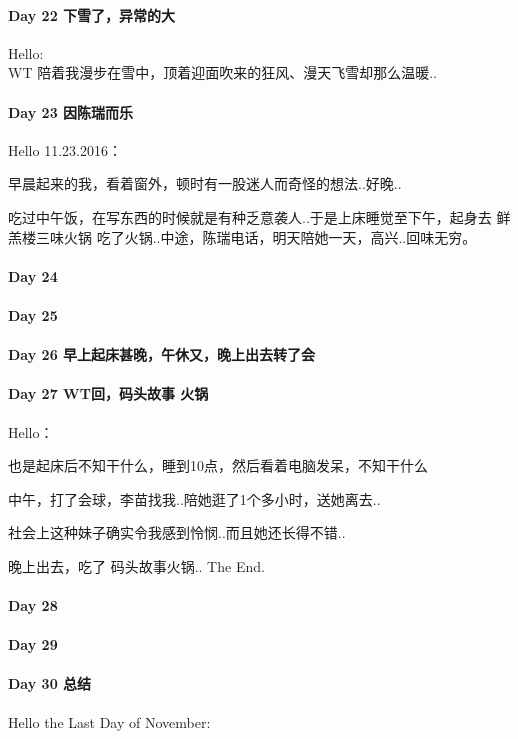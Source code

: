 \documentclass[UTF8,a4paper,8pt]{ctexbook}
\begin{document}
 	 \paragraph{Day 22  下雪了，异常的大   \quad     }Hello:\\
	 	 WT 陪着我漫步在雪中，顶着迎面吹来的狂风、漫天飞雪却那么温暖..
 	 \paragraph{Day 23   因陈瑞而乐   \quad     }
	 	 Hello 11.23.2016：
	 	 
	 	 早晨起来的我，看着窗外，顿时有一股迷人而奇怪的想法..好晚..
	 	 
	 	 吃过中午饭，在写东西的时候就是有种乏意袭人..于是上床睡觉至下午，起身去 鲜羔楼三味火锅 吃了火锅..中途，陈瑞电话，明天陪她一天，高兴..回味无穷。
 	 \paragraph{Day 24      \quad     }
 	 \paragraph{Day 25      \quad     }
 	 \paragraph{Day 26   早上起床甚晚，午休又，晚上出去转了会   \quad     }
 	 \paragraph{Day 27   WT回，码头故事 火锅   \quad     }
	 	 Hello：
	 	 
	 	 也是起床后不知干什么，睡到10点，然后看着电脑发呆，不知干什么
	 	 
	 	 中午，打了会球，李苗找我..陪她逛了1个多小时，送她离去..
	 	 
	 	 社会上这种妹子确实令我感到怜悯..而且她还长得不错..
	 	 
	 	 晚上出去，吃了 码头故事火锅..  The End.
 	 \paragraph{Day 28      \quad     }
 	 \paragraph{Day 29      \quad     }   
 	 \paragraph{Day 30   总结   \quad     }
	 	 Hello the Last Day of November:
	 	 
\end{document}
